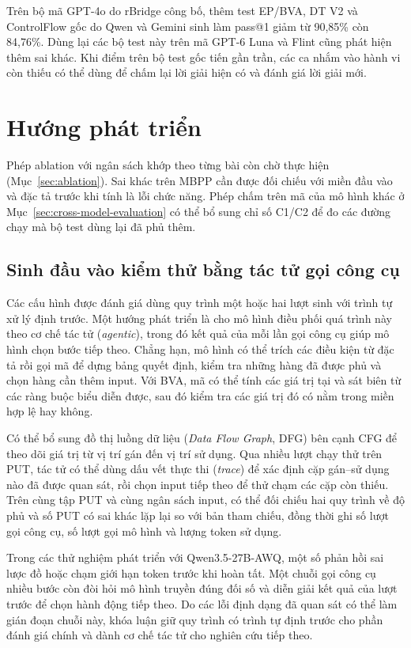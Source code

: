 Trên bộ mã GPT-4o do rBridge công bố, thêm test EP/BVA, DT V2 và ControlFlow gốc do Qwen và Gemini sinh làm pass@1 giảm từ 90,85\% còn 84,76\%. Dùng lại các bộ test này trên mã GPT-6 Luna và Flint cũng phát hiện thêm sai khác. Khi điểm trên bộ test gốc tiến gần trần, các ca nhắm vào hành vi còn thiếu có thể dùng để chấm lại lời giải hiện có và đánh giá lời giải mới.

\section*{Hướng phát triển}

Phép ablation với ngân sách khớp theo từng bài còn chờ thực hiện (Mục~\ref{sec:ablation}). Sai khác trên MBPP cần được đối chiếu với miền đầu vào và đặc tả trước khi tính là lỗi chức năng. Phép chấm trên mã của mô hình khác ở Mục~\ref{sec:cross-model-evaluation} có thể bổ sung chỉ số C1/C2 để đo các đường chạy mà bộ test dùng lại đã phủ thêm.

\subsection*{Sinh đầu vào kiểm thử bằng tác tử gọi công cụ}

Các cấu hình được đánh giá dùng quy trình một hoặc hai lượt sinh với trình tự xử lý định trước. Một hướng phát triển là cho mô hình điều phối quá trình này theo cơ chế tác tử (\textit{agentic}), trong đó kết quả của mỗi lần gọi công cụ giúp mô hình chọn bước tiếp theo. Chẳng hạn, mô hình có thể trích các điều kiện từ đặc tả rồi gọi mã để dựng bảng quyết định, kiểm tra những hàng đã được phủ và chọn hàng cần thêm input. Với BVA, mã có thể tính các giá trị tại và sát biên từ các ràng buộc biểu diễn được, sau đó kiểm tra các giá trị đó có nằm trong miền hợp lệ hay không.

Có thể bổ sung đồ thị luồng dữ liệu (\textit{Data Flow Graph}, DFG) bên cạnh CFG để theo dõi giá trị từ vị trí gán đến vị trí sử dụng. Qua nhiều lượt chạy thử trên PUT, tác tử có thể dùng dấu vết thực thi (\textit{trace}) để xác định cặp gán--sử dụng nào đã được quan sát, rồi chọn input tiếp theo để thử chạm các cặp còn thiếu. Trên cùng tập PUT và cùng ngân sách input, có thể đối chiếu hai quy trình về độ phủ và số PUT có sai khác lặp lại so với bản tham chiếu, đồng thời ghi số lượt gọi công cụ, số lượt gọi mô hình và lượng token sử dụng.

Trong các thử nghiệm phát triển với Qwen3.5-27B-AWQ, một số phản hồi sai lược đồ hoặc chạm giới hạn token trước khi hoàn tất. Một chuỗi gọi công cụ nhiều bước còn đòi hỏi mô hình truyền đúng đối số và diễn giải kết quả của lượt trước để chọn hành động tiếp theo. Do các lỗi định dạng đã quan sát có thể làm gián đoạn chuỗi này, khóa luận giữ quy trình có trình tự định trước cho phần đánh giá chính và dành cơ chế tác tử cho nghiên cứu tiếp theo.

